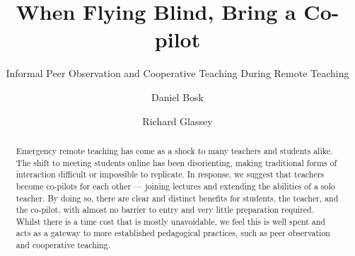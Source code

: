 \documentclass[sigconf,natbib=false]{acmart}
\begin{document}
\title{When Flying Blind, Bring a Co-pilot}
\subtitle{Informal Peer Observation and Cooperative Teaching During Remote Teaching}


\author{Daniel Bosk}
\orcid{}

\author{Richard Glassey}
\orcid{}
\fancyhead{}


\begin{abstract}

Emergency remote teaching has come as a shock to many teachers and students 
alike. The shift to meeting students online has been disorienting, making 
traditional forms of interaction difficult or impossible to replicate. In 
response, we suggest that teachers become co-pilots for each other --- joining 
lectures and extending the abilities of a solo teacher. By doing so, there are 
clear and distinct benefits for students, the teacher, and the co-pilot, with 
almost no barrier to entry and very little preparation required. Whilst there 
is a time cost that is mostly unavoidable, we feel this is well spent and acts 
as a gateway to more established pedagogical practices, such as peer 
observation and cooperative teaching.

\end{abstract}

\begin{CCSXML}

\end{CCSXML}
\end{document}
